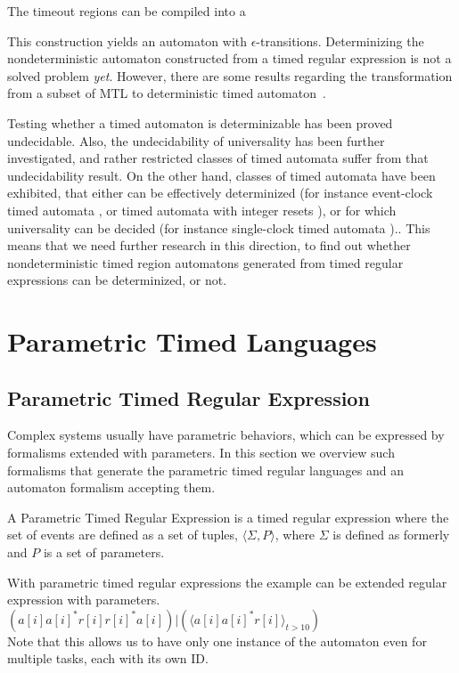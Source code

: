 		The timeout regions can be compiled into a 
	
		This construction yields an automaton with $\epsilon$-transitions. Determinizing the nondeterministic automaton constructed from a timed regular expression is not a solved problem \emph{yet}. However, there are some results regarding the transformation from a subset of MTL to deterministic timed automaton~\citep{nivckovic2010mtl}.
		
		Testing whether a timed automaton is determinizable has been proved undecidable\citep{finkel2006undecidable}.
		Also, the undecidability of universality has been further investigated, and rather restricted classes of timed automata suffer from that undecidability result. On the other hand, classes of timed automata have been exhibited, that either can be effectively determinized (for instance event-clock timed automata \citep{alur1994determinizable}, or timed automata
		with integer resets \citep{suman2008timed}), or for which universality can be decided (for instance single-clock timed automata \citep{ouaknine2004language}).\citep{baier2009timed}.
		This means that we need further research in this direction, to find out whether nondeterministic timed region automatons generated from timed regular expressions can be determinized, or not.
		

\section{Parametric Timed Languages}
		
	\subsection{Parametric Timed Regular Expression}

		Complex systems usually have parametric behaviors, which can be expressed by formalisms extended with parameters. In this section we overview such formalisms that generate the parametric timed regular languages and an automaton formalism accepting them.

		\begin{dfn}
		A Parametric Timed Regular Expression is a timed regular expression where the set of events are defined as a set of tuples, $\langle \Sigma, P \rangle$,
		where $\Sigma$ is defined as formerly and $P$ is a set of parameters.
		\end{dfn}
		
		With parametric timed regular expressions the example can be extended regular expression with parameters. \\
		$(a[i] a[i]^\ast  r[i] r[i]^\ast a[i]) | (\langle a[i] a[i]^\ast r[i]\rangle_{t > 10} )$ \\
		Note that this allows us to have only one instance of the automaton even for multiple tasks, each with its own ID.
	
